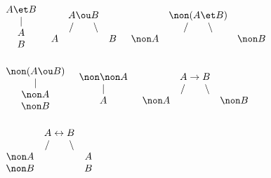 \\
$\begin{array}{c} A\et B \\ | \\ A \\ B \end{array}$
\hspace{2cm}
$\begin{array}{ccc} & A \ou B & \\  & / \hspace{0.7cm} \backslash & \\ A &  & B \end{array}$
\hspace{2cm}
$\begin{array}{ccc} & \non (A \et B) & \\ & / \hspace{0.7cm} \backslash & \\ \non A & & \non B \end{array}$
\hspace{2cm} \\ \\ \vspace{1cm}
$\begin{array}{c} \non (A\ou B) \\ | \\ \non A \\ \non B \end{array}$
\hspace{2cm}
$\begin{array}{c} \non\non A \\ | \\ A \end{array}$
\hspace{2cm}
$\begin{array}{ccc} & A \rightarrow B & \\ & / \hspace{0.7cm} \backslash & \\ \non A & & \non B \end{array}$
\hspace{2cm}\\ \\ \vspace{1cm}
$\begin{array}{ccc} & A \leftrightarrow B & \\ & / \hspace{0.7cm} \backslash & \\ \non A & & A \\ \non B & & B \end{array}$
